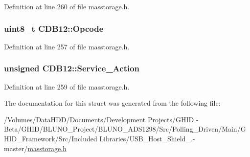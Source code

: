 \-Definition at line 260 of file masstorage.\-h.

\hypertarget{struct_c_d_b12_a75c7fb542c6c0ad6ba4a0e95a49ba1e1}{
\subsubsection[{\-Opcode}]{\setlength{\rightskip}{0pt plus 5cm}uint8\-\_\-t {\bf \-C\-D\-B12\-::\-Opcode}}}\label{struct_c_d_b12_a75c7fb542c6c0ad6ba4a0e95a49ba1e1}


\-Definition at line 257 of file masstorage.\-h.

\hypertarget{struct_c_d_b12_a7d9153a24a41f0432b1467b39d1d5238}{
\subsubsection[{\-Service\-\_\-\-Action}]{\setlength{\rightskip}{0pt plus 5cm}unsigned {\bf \-C\-D\-B12\-::\-Service\-\_\-\-Action}}}\label{struct_c_d_b12_a7d9153a24a41f0432b1467b39d1d5238}


\-Definition at line 259 of file masstorage.\-h.



\-The documentation for this struct was generated from the following file\-:\begin{DoxyCompactItemize}
\item 
/\-Volumes/\-Data\-H\-D\-D/\-Documents/\-Development Projects/\-G\-H\-I\-D -\/ Beta/\-G\-H\-I\-D/\-B\-L\-U\-N\-O\-\_\-\-Project/\-B\-L\-U\-N\-O\-\_\-\-A\-D\-S1298/\-Src/\-Polling\-\_\-\-Driven/\-Main/\-G\-H\-I\-D\-\_\-\-Framework/\-Src/\-Included Libraries/\-U\-S\-B\-\_\-\-Host\-\_\-\-Shield\-\_.-\/master/\hyperlink{masstorage_8h}{masstorage.\-h}\end{DoxyCompactItemize}
